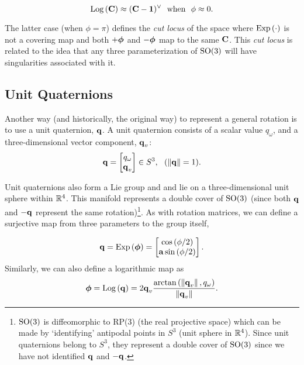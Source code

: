 \begin{equation}
	\mathrm{Log}\left({\boldsymbol{\mathbf{C}}}\right) \approx (\boldsymbol{\mathbf{C}} - \boldsymbol{\mathbf{1}})^\vee ~~ \textrm{when} ~~ \phi \approx 0. 
\end{equation}

The latter case (when $\phi = \pi$) defines the \textit{cut locus} of the space where $\mathrm{Exp}\left({\cdot}\right)$ is not a covering map and both $+\boldsymbol{\mathbf{\phi}}$ and $-\boldsymbol{\mathbf{\phi}}$ map to the same $\boldsymbol{\mathbf{C}}$. This \textit{cut locus} is related to the idea that any three parameterization of $\mathrm{SO}(3)$ will have singularities associated with it.

\subsection{Unit Quaternions}

Another way (and historically, the original way) to represent a general rotation is to use a unit quaternion, $\boldsymbol{\mathbf{q}}$. A unit quaternion consists of a scalar value $q_\omega$, and a three-dimensional vector component, $\boldsymbol{\mathbf{q}}_v$:
\begin{equation}
	\boldsymbol{\mathbf{q}} = \begin{bmatrix} q_\omega \\ \boldsymbol{\mathbf{q}}_v \end{bmatrix} \in S^3, ~~ (\left\Vert\boldsymbol{\mathbf{q}}\right\Vert = 1).
\end{equation}

Unit quaternions also form a Lie group \citep{Sola2018-kg} and and lie on a three-dimensional unit sphere within $\mathbb{R}{}^4$. This manifold represents a double cover of $\mathrm{SO}(3)$ (since both $\boldsymbol{\mathbf{q}}$ and $-\boldsymbol{\mathbf{q}}$ represent the same rotation)\footnote{$\mathrm{SO}(3)$ is diffeomorphic to RP(3) (the real projective space) which can be made by `identifying' antipodal points in $S^3$ (unit sphere in $\RealNumbers^4$). Since unit quaternions belong to $S^3$, they represent a double cover of $\mathrm{SO}(3)$ since we have not identified $\boldsymbol{\mathbf{q}}$ and $-\boldsymbol{\mathbf{q}}$.}. As with rotation matrices, we can define a surjective map from three parameters to the group itself,

\begin{equation}
\boldsymbol{\mathbf{q}} = \mathrm{Exp}\left({\boldsymbol{\mathbf{\phi}}}\right) = \begin{bmatrix} \cos{(\phi/2)} \\ \boldsymbol{\mathbf{a}} \sin{(\phi/2)} \end{bmatrix}.	
\end{equation}
Similarly, we can also define a logarithmic map as
\begin{align}
\label{eq:math_quat_log}
	\boldsymbol{\mathbf{\phi}} =  \mathrm{Log}\left({\boldsymbol{\mathbf{q}}}\right) = 2 \boldsymbol{\mathbf{q}}_v \frac{\arctan{(\left\Vert \boldsymbol{\mathbf{q}} _v\right\Vert ,  q_\omega})}{\left\Vert\boldsymbol{\mathbf{q}}_v\right\Vert}.
\end{align}

